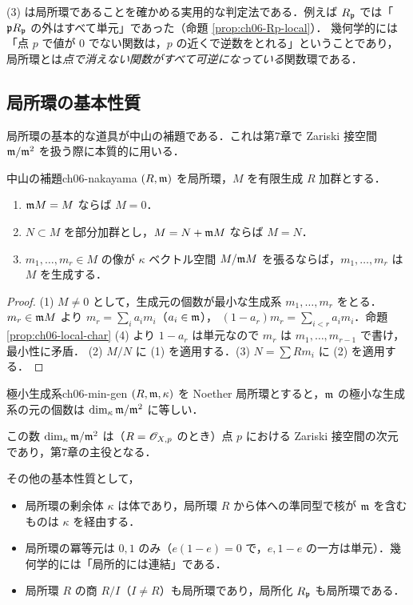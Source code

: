 (3) は局所環であることを確かめる実用的な判定法である．例えば $R_{\mathfrak{p}}$ では「$\mathfrak{p} R_{\mathfrak{p}}$ の外はすべて単元」であった（命題 \ref{prop:ch06-Rp-local}）．
幾何学的には「点 $p$ で値が $0$ でない関数は，$p$ の近くで逆数をとれる」ということであり，
局所環とは\emph{点で消えない関数がすべて可逆になっている}関数環である．

\subsection{局所環の基本性質}

局所環の基本的な道具が中山の補題である．これは第7章で Zariski 接空間 $\mathfrak{m}/\mathfrak{m}^2$ を扱う際に本質的に用いる．

\begin{mylem}{中山の補題}{ch06-nakayama}
$(R,\mathfrak{m})$ を局所環，$M$ を有限生成 $R$ 加群とする．
\begin{enumerate}
  \item $\mathfrak{m} M=M$ ならば $M=0$．
  \item $N\subset M$ を部分加群とし，$M=N+\mathfrak{m} M$ ならば $M=N$．
  \item $m_1,\dots,m_r\in M$ の像が $\kappa$ ベクトル空間 $M/\mathfrak{m} M$ を張るならば，$m_1,\dots,m_r$ は $M$ を生成する．
\end{enumerate}
\end{mylem}

\begin{proof}
(1) $M\neq 0$ として，生成元の個数が最小な生成系 $m_1,\dots,m_r$ をとる．$m_r\in\mathfrak{m} M$ より $m_r=\sum_i a_im_i$（$a_i\in\mathfrak{m}$），
$(1-a_r)m_r=\sum_{i<r}a_im_i$．命題 \ref{prop:ch06-local-char} (4) より $1-a_r$ は単元なので $m_r$ は $m_1,\dots,m_{r-1}$ で書け，最小性に矛盾．
(2) $M/N$ に (1) を適用する．(3) $N=\sum Rm_i$ に (2) を適用する．
\end{proof}

\begin{mycor}{極小生成系}{ch06-min-gen}
$(R,\mathfrak{m},\kappa)$ を Noether 局所環とすると，$\mathfrak{m}$ の極小な生成系の元の個数は $\dim_\kappa\mathfrak{m}/\mathfrak{m}^2$ に等しい．
\end{mycor}

この数 $\dim_\kappa\mathfrak{m}/\mathfrak{m}^2$ は（$R=\mathscr{O}_{X,p}$ のとき）点 $p$ における Zariski 接空間の次元であり，第7章の主役となる．

その他の基本性質として，
\begin{itemize}
  \item 局所環の剰余体 $\kappa$ は体であり，局所環 $R$ から体への準同型で核が $\mathfrak{m}$ を含むものは $\kappa$ を経由する．
  \item 局所環の冪等元は $0,1$ のみ（$e(1-e)=0$ で，$e,1-e$ の一方は単元）．幾何学的には「局所的には連結」である．
  \item 局所環 $R$ の商 $R/I$（$I\neq R$）も局所環であり，局所化 $R_{\mathfrak{p}}$ も局所環である．
\end{itemize}


